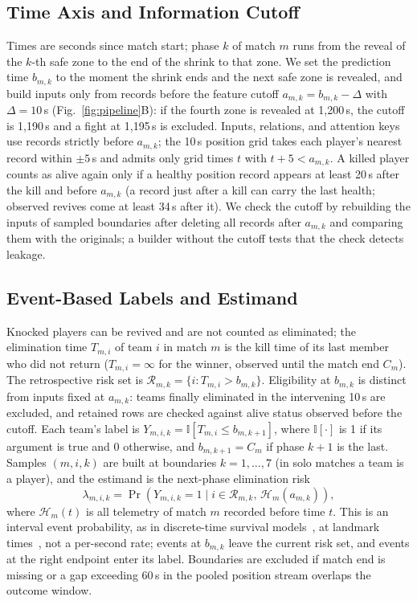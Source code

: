 \documentclass[sigconf,anonymous,nonacm]{acmart}
\begin{document}
\subsection{Time Axis and Information Cutoff}
\label{sec:method:samples}
Times are seconds since match start; phase $k$ of match $m$ runs from the reveal of the $k$-th safe zone to the end of the shrink to that zone.
We set the prediction time $b_{m,k}$ to the moment the shrink ends and the next safe zone is revealed, and build inputs only from records before the feature cutoff $a_{m,k}=b_{m,k}-\Delta$ with $\Delta=10$\,s (Fig.~\ref{fig:pipeline}B): if the fourth zone is revealed at 1,200\,s, the cutoff is 1,190\,s and a fight at 1,195\,s is excluded. Inputs, relations, and attention keys use records strictly before $a_{m,k}$; the 10\,s position grid takes each player's nearest record within $\pm5$\,s and admits only grid times $t$ with $t+5<a_{m,k}$.
A killed player counts as alive again only if a healthy position record appears at least 20\,s after the kill and before $a_{m,k}$ (a record just after a kill can carry the last health; observed revives come at least 34\,s after it).
We check the cutoff by rebuilding the inputs of sampled boundaries after deleting all records after $a_{m,k}$ and comparing them with the originals; a builder without the cutoff tests that the check detects leakage.

\subsection{Event-Based Labels and Estimand}
\label{sec:method:labels}
Knocked players can be revived and are not counted as eliminated; the elimination time $T_{m,i}$ of team $i$ in match $m$ is the kill time of its last member who did not return ($T_{m,i}=\infty$ for the winner, observed until the match end $C_m$).
The retrospective risk set is $\mathcal{R}_{m,k}=\{i:T_{m,i}>b_{m,k}\}$. Eligibility at $b_{m,k}$ is distinct from inputs fixed at $a_{m,k}$: teams finally eliminated in the intervening 10\,s are excluded, and retained rows are checked against alive status observed before the cutoff.
Each team's label is $Y_{m,i,k}=\mathbb{I}[T_{m,i}\le b_{m,k+1}]$, where $\mathbb{I}[\cdot]$ is 1 if its argument is true and 0 otherwise, and $b_{m,k+1}=C_m$ if phase $k+1$ is the last.
Samples $(m,i,k)$ are built at boundaries $k=1,\dots,7$ (in solo matches a team is a player), and the estimand is the next-phase elimination risk
\begin{equation}
\lambda_{m,i,k}=\Pr\!\left(Y_{m,i,k}=1 \mid i\in\mathcal{R}_{m,k},\,\mathcal{H}_{m}(a_{m,k})\right),
\label{eq:hazard}
\end{equation}
where $\mathcal{H}_{m}(t)$ is all telemetry of match $m$ recorded before time $t$.
This is an interval event probability, as in discrete-time survival models~\cite{SingerWillett93,Gensheimer19}, at landmark times~\cite{vanHouwelingen07}, not a per-second rate; events at $b_{m,k}$ leave the current risk set, and events at the right endpoint enter its label. Boundaries are excluded if match end is missing or a gap exceeding 60\,s in the pooled position stream overlaps the outcome window.
\end{document}
